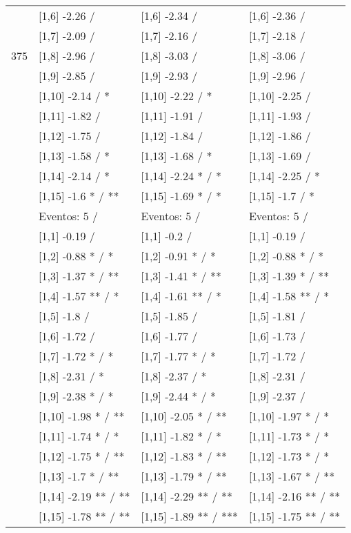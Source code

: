 \begin{table}
\begin{tabular}[t]{llll}
 & {}[1,6] -2.26  / & {}[1,6] -2.34  / & {}[1,6] -2.36  /\\
 & {}[1,7] -2.09  / & {}[1,7] -2.16  / & {}[1,7] -2.18  /\\
375 & {}[1,8] -2.96  / & {}[1,8] -3.03  / & {}[1,8] -3.06  /\\
\addlinespace
 & {}[1,9] -2.85  / & {}[1,9] -2.93  / & {}[1,9] -2.96  /\\
 & {}[1,10] -2.14  / * & {}[1,10] -2.22  / * & {}[1,10] -2.25  /\\
 & {}[1,11] -1.82  / & {}[1,11] -1.91  / & {}[1,11] -1.93  /\\
 & {}[1,12] -1.75  / & {}[1,12] -1.84  / & {}[1,12] -1.86  /\\
 & {}[1,13] -1.58  / * & {}[1,13] -1.68  / * & {}[1,13] -1.69  /\\
\addlinespace
 & {}[1,14] -2.14  / * & {}[1,14] -2.24 * / * & {}[1,14] -2.25  / *\\
 & {}[1,15] -1.6 * / ** & {}[1,15] -1.69 * / * & {}[1,15] -1.7  / *\\
 & Eventos:  5 / & Eventos:  5 / & Eventos:  5 /\\
 & {}[1,1] -0.19  / & {}[1,1] -0.2  / & {}[1,1] -0.19  /\\
 & {}[1,2] -0.88 * / * & {}[1,2] -0.91 * / * & {}[1,2] -0.88 * / *\\
\addlinespace
 & {}[1,3] -1.37 * / ** & {}[1,3] -1.41 * / ** & {}[1,3] -1.39 * / **\\
 & {}[1,4] -1.57 ** / * & {}[1,4] -1.61 ** / * & {}[1,4] -1.58 ** / *\\
 & {}[1,5] -1.8  / & {}[1,5] -1.85  / & {}[1,5] -1.81  /\\
 & {}[1,6] -1.72  / & {}[1,6] -1.77  / & {}[1,6] -1.73  /\\
 & {}[1,7] -1.72 * / * & {}[1,7] -1.77 * / * & {}[1,7] -1.72  /\\
\addlinespace
500 & {}[1,8] -2.31  / * & {}[1,8] -2.37  / * & {}[1,8] -2.31  /\\
 & {}[1,9] -2.38 * / * & {}[1,9] -2.44 * / * & {}[1,9] -2.37  /\\
 & {}[1,10] -1.98 * / ** & {}[1,10] -2.05 * / ** & {}[1,10] -1.97 * / *\\
 & {}[1,11] -1.74 * / * & {}[1,11] -1.82 * / * & {}[1,11] -1.73 * / *\\
 & {}[1,12] -1.75 * / ** & {}[1,12] -1.83 * / ** & {}[1,12] -1.73 * / *\\
\addlinespace
 & {}[1,13] -1.7 * / ** & {}[1,13] -1.79 * / ** & {}[1,13] -1.67 * / **\\
 & {}[1,14] -2.19 ** / ** & {}[1,14] -2.29 ** / ** & {}[1,14] -2.16 ** / **\\
 & {}[1,15] -1.78 ** / ** & {}[1,15] -1.89 ** / *** & {}[1,15] -1.75 ** / **\\
\bottomrule
\end{tabular}
\end{table}
